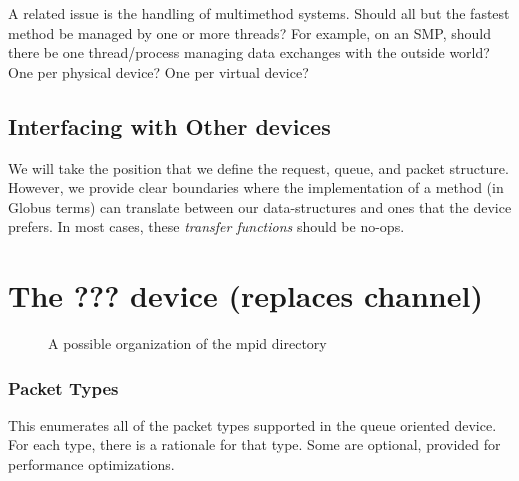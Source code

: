 \documentclass{article}
\begin{document}
A related issue is the handling of multimethod systems.  Should all but the
fastest method be managed by one or more threads?  For example, on an SMP,
should there be one thread/process managing data exchanges with the outside
world?  One per physical device?  One per virtual device?

\subsection{Interfacing with Other devices}
We will take the position that we define the request, queue, and packet
structure.  However, we provide clear boundaries where the implementation of a
method (in Globus terms) can translate between our data-structures and ones
that the device prefers.  In most cases, these \emph{transfer functions}
should be no-ops.

\section{The ??? device (replaces channel)}

\begin{figure}
\centerline{}
\caption{A possible organization of the mpid directory}
\end{figure}
\subsubsection{Packet Types}
This enumerates all of the packet types supported in the queue oriented
device.  For each type, there is a rationale for that type.  Some are
optional, provided for performance optimizations.
\end{document}
